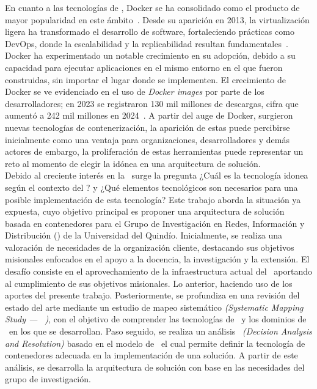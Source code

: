 En cuanto a las tecnologías de \VBC, Docker se ha consolidado como el producto de mayor popularidad en este ámbito~\citep{haque2020challenges}. Desde su aparición en 2013, la virtualización ligera ha transformado el desarrollo de software, fortaleciendo prácticas como DevOps, donde la escalabilidad y la replicabilidad resultan fundamentales~\citep{Docker2021}. Docker ha experimentado un notable crecimiento en su adopción, debido a su capacidad para ejecutar aplicaciones en el mismo entorno en el que fueron construidas, sin importar el lugar donde se implementen. El crecimiento de Docker se ve evidenciado en el uso de \textit{Docker images} por parte de los desarrolladores; en 2023 se registraron 130 mil millones de descargas, cifra que aumentó a 242 mil millones en 2024~\citep{Docker2024}. A partir del auge de Docker, surgieron nuevas tecnologías de contenerización, la aparición de estas puede percibirse inicialmente como una ventaja para organizaciones, desarrolladores y demás actores de \TI\;\@sin embargo, la proliferación de estas herramientas puede representar un reto al momento de elegir la idónea en una arquitectura de solución.\\
Debido al creciente interés en la \VBC\ surge la pregunta ¿Cuál es la tecnología idonea según el contexto del \GRID? y ¿Qué elementos tecnológicos son necesarios para una posible implementación de esta tecnología?  Este trabajo aborda la situación ya expuesta, cuyo objetivo principal es proponer una arquitectura de solución basada en contenedores para el Grupo de Investigación en Redes, Información y Distribución (\GRID) de la Universidad del Quindío. Inicialmente, se realiza una valoración de necesidades de la organización cliente, destacando sus objetivos misionales enfocados en el apoyo a la docencia, la investigación y la extensión. El desafío consiste en el aprovechamiento de la infraestructura actual del \GRID\ aportando al cumplimiento de sus objetivos misionales. Lo anterior, haciendo uso de los aportes del presente trabajo. Posteriormente, se profundiza en una revisión del estado del arte mediante un estudio de mapeo sistemático \textit{(Systematic Mapping Study --- \SMS\ )}, con el objetivo de comprender las tecnologías de \VBC\ y los dominios de \TI\ en los que se desarrollan. Paso seguido, se realiza un análisis \DAR\ \textit{(Decision Analysis and Resolution)} basado en el modelo de \CMMI\, el cual permite definir la tecnología de contenedores adecuada
en la implementación de una solución. A partir de este análisis, se desarrolla la arquitectura de solución con base en las necesidades del grupo de investigación.